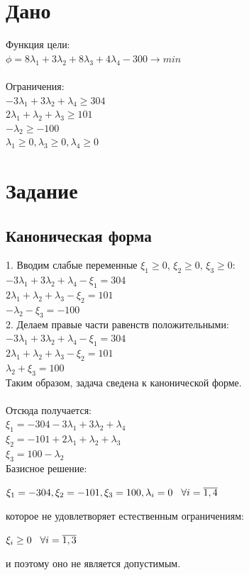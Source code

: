 \documentclass[14pt,a4paper,fleqn]{extarticle}
\begin{document}
\section*{Дано}
Функция цели:\\
$\phi = 8\lambda_1 + 3\lambda_2 + 8\lambda_3 + 4\lambda_4 - 300 \longrightarrow min$\\\\
Ограничения:\\
$-3\lambda_1 + 3\lambda_2 + \lambda_4 \geq 304$\\
$2\lambda_1 + \lambda_2 + \lambda_3 \geq 101$\\
$-\lambda_2 \geq -100$\\
$\lambda_1 \geq 0, \lambda_3 \geq 0, \lambda_4 \geq 0$\\
\section*{Задание}
\subsection*{Каноническая форма}
1. Вводим слабые переменные $\xi_1 \geq 0$, $\xi_2 \geq 0$, $\xi_3 \geq 0$:\\
$-3\lambda_1 + 3\lambda_2 + \lambda_4 - \xi_1 = 304$\\
$2\lambda_1 + \lambda_2 + \lambda_3 - \xi_2 = 101$\\
$-\lambda_2 - \xi_3 = -100$\\

2. Делаем правые части равенств положительными:\\
$-3\lambda_1 + 3\lambda_2 + \lambda_4 - \xi_1 = 304$\\
$2\lambda_1 + \lambda_2 + \lambda_3 - \xi_2 = 101$\\
$\lambda_2 + \xi_3 = 100$\\

Таким образом, задача сведена к канонической форме.\\\\
Отсюда получается:\\
$\xi_1 = -304 - 3\lambda_1 + 3\lambda_2 + \lambda_4$\\
$\xi_2 = -101 + 2\lambda_1 + \lambda_2 + \lambda_3$\\
$\xi_3 = 100 - \lambda_2$\\
\newpage
Базисное решение:
\begin{center}
$\xi_1 = -304, \xi_2 = -101, \xi_3 = 100, \lambda_i = 0 \hspace*{0.3cm} \forall i = \overline{1,4}$
\end{center}
которое не удовлетворяет естественным ограничениям:
\begin{center}
	$\xi_i \geq 0 \hspace*{0.3cm} \forall i = \overline{1,3}$
\end{center}
и поэтому оно не является допустимым.
\end{document}
